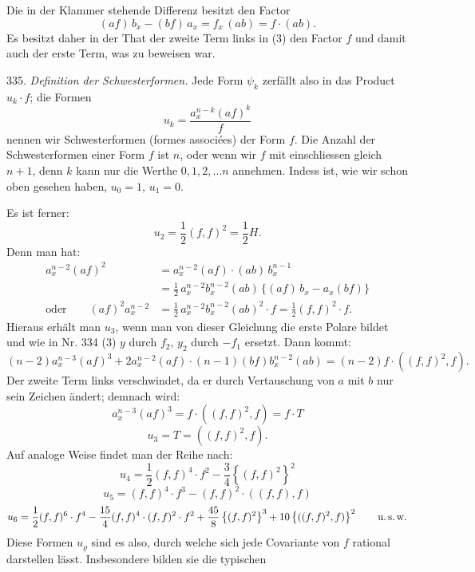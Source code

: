 Die in der Klammer stehende Differenz besitzt den Factor
\[
(af)\,b_x - (bf)\,a_x = f_x\,(ab) = f\cdot (ab).
\]
Es besitzt daher in der That der zweite Term links in (3) den Factor
$f$ und damit auch der erste Term, was zu beweisen war.

335. \textit{Definition der Schwesterformen.} Jede Form $\psi_k$ zerfällt also
in das Product $u_k\cdot f$; die Formen
\[
u_k = \frac{a_x^{n-k}(af)^k}{f}
\]
nennen wir \glqq Schwesterformen\grqq{} (formes associées) der Form $f$. Die
Anzahl der Schwesterformen einer Form $f$ ist $n$, oder wenn wir $f$ mit
einschliessen gleich $n+1$, denn $k$ kann nur die Werthe $0, 1, 2, \dots n$
annehmen. Indess ist, wie wir schon oben gesehen haben, $u_0=1$,
$u_1=0$.

Es ist ferner:
\[
u_2 = \frac{1}{2}(f,f)^2 = \frac{1}{2}H.
\]
Denn man hat:
\[
\begin{aligned}
a_x^{n-2}(af)^2 &= a_x^{n-2}(af)\cdot(ab)\,b_x^{n-1}\\
&= \frac{1}{2}\,a_x^{n-2}b_x^{n-2}(ab)\,\{(af)\,b_x - a_x(bf)\}\\
\text{oder}\qquad (af)^2 a_x^{n-2} &= \frac{1}{2}\,a_x^{n-2}b_x^{n-2}(ab)^2\cdot f = \frac{1}{2}(f,f)^2\cdot f.
\end{aligned}
\]
Hieraus erhält man $u_3$, wenn man von dieser Gleichung die erste
Polare bildet und wie in Nr. 334 (3) $y$ durch $f_2$, $y_2$ durch
$-f_1$ ersetzt. Dann kommt:
\[
(n-2)a_x^{n-3}(af)^3+2a_x^{n-2}(af)\cdot(n-1)(bf)b_x^{n-2}(ab)=(n-2)f\cdot((f,f)^2,f).
\]
Der zweite Term links verschwindet, da er durch Vertauschung von
$a$ mit $b$ nur sein Zeichen ändert; demnach wird:
\[
a_x^{n-3}(af)^3 = f\cdot((f,f)^2,f) = f\cdot T
\]
\[
u_3 = T = ((f,f)^2,f).
\]
Auf analoge Weise findet man der Reihe nach:
\[
u_4 = \frac{1}{2}(f,f)^4\cdot f^2 - \frac{3}{4}\left\{(f,f)^2\right\}^2
\]
\[
u_5 = (f,f)^4\cdot f^3 - (f,f)^2\cdot((f,f),f)
\]
\[
u_6 = \frac{1}{2}(f,f)^6\cdot f^4 - \frac{15}{4}(f,f)^4\cdot(f,f)^2\cdot f^2 + \frac{45}{8}\left\{(f,f)^2\right\}^3 + 10\left\{((f,f)^2,f)\right\}^2 \qquad \text{u.\,s.\,w.}
\]
Diese Formen $u_\varrho$ sind es also, durch welche sich jede Covariante von
$f$ rational darstellen lässt. Insbesondere bilden sie die typischen


